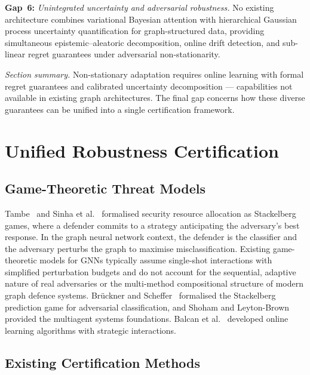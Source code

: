 \medskip
\noindent\textbf{Gap~6:} \emph{Unintegrated uncertainty and adversarial robustness.} No existing architecture combines variational Bayesian attention with hierarchical Gaussian process uncertainty quantification for graph-structured data, providing simultaneous epistemic--aleatoric decomposition, online drift detection, and sub-linear regret guarantees under adversarial non-stationarity.

\medskip
\noindent\textit{Section summary.} Non-stationary adaptation requires online learning with formal regret guarantees and calibrated uncertainty decomposition --- capabilities not available in existing graph architectures. The final gap concerns how these diverse guarantees can be unified into a single certification framework.


\section{Unified Robustness Certification}
\label{sec:certification}

\subsection{Game-Theoretic Threat Models}

Tambe~\cite{Tambe2011} and Sinha et al.~\cite{Sinha2018} formalised security resource allocation as Stackelberg games, where a defender commits to a strategy anticipating the adversary's best response. In the graph neural network context, the defender is the classifier and the adversary perturbs the graph to maximise misclassification. Existing game-theoretic models for GNNs typically assume single-shot interactions with simplified perturbation budgets and do not account for the sequential, adaptive nature of real adversaries or the multi-method compositional structure of modern graph defence systems. Br\"{u}ckner and Scheffer~\cite{Bruckner2011} formalised the Stackelberg prediction game for adversarial classification, and Shoham and Leyton-Brown~\cite{Shoham2009} provided the multiagent systems foundations. Balcan et al.~\cite{Balcan2015} developed online learning algorithms with strategic interactions.


\subsection{Existing Certification Methods}

